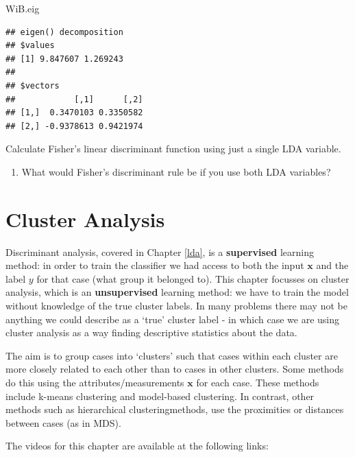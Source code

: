 \documentclass[
]{book}
\newenvironment{Shaded}{\begin{snugshade}}{\end{snugshade}}
\newcommand{\NormalTok}[1]{#1}
\providecommand{\tightlist}{%
  \setlength{\itemsep}{0pt}\setlength{\parskip}{0pt}}
\theoremstyle{definition}
\theoremstyle{definition}
\theoremstyle{definition}
\theoremstyle{definition}
\theoremstyle{remark}
\begin{document}
\begin{Shaded}
\begin{Highlighting}[]
\NormalTok{WiB.eig}
\end{Highlighting}
\end{Shaded}

\begin{verbatim}
## eigen() decomposition
## $values
## [1] 9.847607 1.269243
## 
## $vectors
##            [,1]      [,2]
## [1,]  0.3470103 0.3350582
## [2,] -0.9378613 0.9421974
\end{verbatim}

Calculate Fisher's linear discriminant function using just a single LDA variable.

\begin{enumerate}
\def\labelenumi{\roman{enumi}.}
\setcounter{enumi}{3}
\tightlist
\item
  What would Fisher's discriminant rule be if you use both LDA variables?
\end{enumerate}

\hypertarget{cluster}{%
\chapter{Cluster Analysis}\label{cluster}}

Discriminant analysis, covered in Chapter \ref{lda}, is a \textbf{supervised} learning method: in order to train the classifier we had access to both the input \(\mathbf x\) and the label \(y\) for that case (what group it belonged to).
This chapter focusses on cluster analysis, which is an \textbf{unsupervised} learning method: we have to train the model without knowledge of the true cluster labels. In many problems there may not be anything we could describe as a `true' cluster label - in which case we are using cluster analysis as a way finding descriptive statistics about the data.

The aim is to group cases into `clusters' such that cases within each cluster are more closely related to each other than to cases in other clusters. Some methods do this using the attributes/measurements \(\mathbf x\) for each case. These methods include k-means clustering and model-based clustering. In contrast, other methods such as hierarchical clusteringmethods, use the proximities or distances between cases (as in MDS).

The videos for this chapter are available at the following links:
\end{document}
